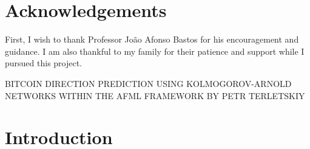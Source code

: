 \documentclass[12pt,a4paper,oneside]{article}
\begin{document}
\newpage
\thispagestyle{plain}
\section*{Acknowledgements}

First, I wish to thank Professor João Afonso Bastos for his encouragement and guidance. I am also thankful to my family for their patience and support while I pursued this project.


\newpage
\thispagestyle{plain}

\setcounter{page}{1}

\begin{center}
\textsc{BITCOIN DIRECTION PREDICTION USING KOLMOGOROV-ARNOLD NETWORKS WITHIN THE AFML FRAMEWORK BY PETR TERLETSKIY}
\end{center}


\section{Introduction}\label{sec:introduction}
\end{document}
